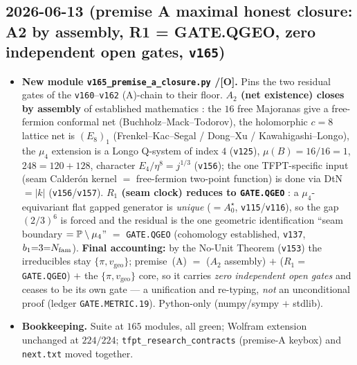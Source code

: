 \documentclass[11pt]{article}
\providecommand{\mO}{\textbf{[O]}}\providecommand{\mX}{\textbf{[X]}}
\providecommand{\vref}[1]{\texttt{#1}}
\begin{document}
\subsection*{2026-06-13 (premise A maximal honest closure: A2 by assembly, R1 = GATE.QGEO, zero independent open gates, \vref{v165})}
\begin{itemize}
\item \textbf{New module \texttt{v165\_premise\_a\_closure.py} \mC/\mO.} Pins the two residual gates of the
  \vref{v160}--\vref{v162} (A)-chain to their floor. \textbf{$A_2$ (net existence) closes by assembly} of
  established mathematics \mC: the $16$ free Majoranas give a free-fermion conformal net
  (Buchholz--Mack--Todorov), the holomorphic $c{=}8$ lattice net is $(E_8)_1$ (Frenkel--Kac--Segal /
  Dong--Xu / Kawahigashi--Longo), the $\mu_4$ extension is a Longo Q-system of index $4$ (\vref{v125}),
  $\mu(B){=}16/16{=}1$, $248{=}120{+}128$, character $E_4/\eta^8{=}j^{1/3}$ (\vref{v156}); the one
  TFPT-specific input (seam Calder\'on kernel $=$ free-fermion two-point function) is done via DtN $=|k|$
  (\vref{v156}/\vref{v157}). \textbf{$R_1$ (seam clock) reduces to \texttt{GATE.QGEO}} \mC: a
  $\mu_4$-equivariant flat gapped generator is \emph{unique} ($=A_0^\star$, \vref{v115}/\vref{v116}), so the
  gap $(2/3)^6$ is forced and the residual is the one geometric identification ``seam boundary $=
  \mathbb{P}\setminus\mu_4$'' $=$ \texttt{GATE.QGEO} (cohomology established, \vref{v137}, $b_1{=}3{=}N_{\mathrm{fam}}$).
  \textbf{Final accounting:} by the No-Unit Theorem (\vref{v153}) the irreducibles stay $\{\pi,
  v_{\mathrm{geo}}\}$; premise~(A) $=$ ($A_2$ assembly) $+$ ($R_1{=}$\texttt{GATE.QGEO}) $+$ the
  $\{\pi,v_{\mathrm{geo}}\}$ core, so it carries \emph{zero independent open gates} and ceases to be its own
  gate --- a unification and re-typing, \emph{not} an unconditional proof (ledger \texttt{GATE.METRIC.19}).
  Python-only (numpy/sympy $+$ stdlib).
\item \textbf{Bookkeeping.} Suite at $165$ modules, all green; Wolfram extension unchanged at $224/224$;
  \texttt{tfpt\_research\_contracts} (premise-A keybox) and \texttt{next.txt} moved together.
\end{itemize}
\end{document}
